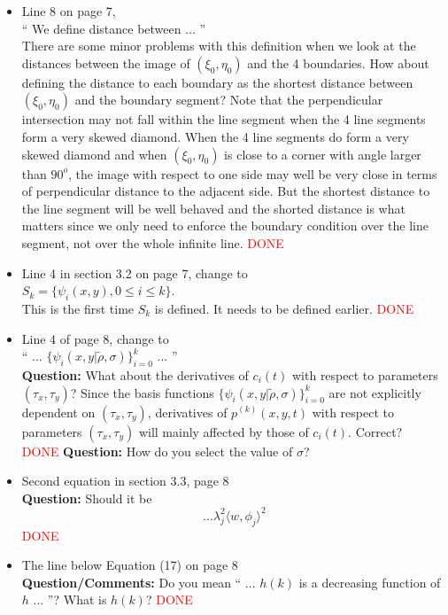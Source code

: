 \documentclass[12pt]{article}
\begin{document}
\begin{itemize}
\item Line 8 on page 7, \\
  `` We define distance between ... '' \\
  There are some minor problems with this definition when we look at
  the distances between the image of $(\xi_0, \eta_0)$ and the 4
  boundaries.  How about defining the distance to each boundary as the
  shortest distance between $(\xi_0, \eta_0)$ and the boundary
  segment? Note that the perpendicular intersection may not fall
  within the line segment when the 4 line segments form a very skewed
  diamond.  When the 4 line segments do form a very skewed diamond and
  when $(\xi_0, \eta_0)$ is close to a corner with angle larger than
  $90^o$, the image with respect to one side may well be very close in
  terms of perpendicular distance to the adjacent side. But the
  shortest distance to the line segment will be well behaved and the
  shorted distance is what matters since we only need to enforce the
  boundary condition over the line segment, not over the whole
  infinite line.  \textcolor{red}{DONE}


\item Line 4 in section 3.2 on page 7, change to \\
  $S_k = \{\psi_i(x, y), 0 \le i \le k\}$. \\
  This is the first time $S_k$ is defined. It needs to be defined
  earlier.  \textcolor{red}{DONE}

\item Line 4 of page 8, change to \\
  `` ... $\{\psi_i(x, y | \tilde{\rho}, \sigma) \}_{i=0}^k $ ... '' \\
  {\bf Question:} What about the derivatives of $c_i(t)$ with respect
  to parameters $(\tau_x, \tau_y)$?  Since the basis functions
  $\{\psi_i(x, y | \tilde{\rho}, \sigma) \}_{i=0}^k $ are not
  explicitly dependent on $(\tau_x, \tau_y)$, derivatives of
  $p^{(k)}(x,y,t) $ with respect to
  parameters $(\tau_x, \tau_y)$ will mainly affected by those of $c_i(t)$. Correct? \\
  \textcolor{red}{DONE} {\bf Question:} How do you select the value of
  $\sigma $?

\item Second equation in section 3.3, page 8 \\
  {\bf Question:} Should it be
$$ ... \lambda_j^2 \langle w, \phi_j \rangle^2 $$
\textcolor{red}{DONE}

\item The line below Equation (17) on page 8 \\
  {\bf Question/Comments:} Do you mean `` ... $h(k)$ is a decreasing
  function of $h$ ... ''? What is $h(k)$?  \textcolor{red}{DONE}


\end{itemize}
\end{document}
